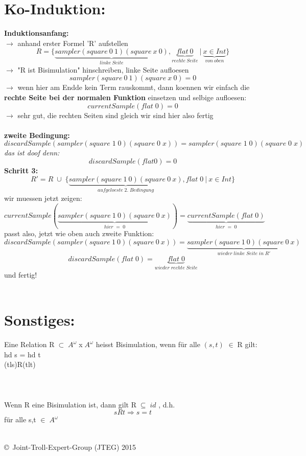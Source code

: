 \documentclass{article}
\begin{document}
	\section{Ko-Induktion:}
	\textbf{Induktionsanfang:}\\
	$\rightarrow$ anhand erster Formel 'R' aufstellen
	\[ 
		R = \{ 
			\underbrace{
				sampler(square\:0\:1)(square\:x\:0)}_{linke\:Seite},\underbrace{flat\:0}_{rechte\:Seite} \:|\: \underbrace{x\in Int}_{von\:oben}\}
		\]
	$\rightarrow$ "R ist Bisimulation" hinschreiben, linke Seite aufloesen\\
	\[ sampler(square\:0\:1)(square\:x\:0) = 0 \]
	$\rightarrow$ wenn hier am Endde kein Term rauskommt, dann koennen wir einfach die \textbf{rechte Seite bei der normalen Funktion} einsetzen und selbige aufloesen:
	\[ currentSample(flat\;0) = 0 \]
	$\rightarrow$ sehr gut, die rechten Seiten sind gleich wir sind hier also fertig\\ \\
	\textbf{zweite Bedingung:}
		\[discardSample(sampler(square\;1\;0)(square\;0\;x)) = sampler(square\;1\;0)(square\;0\;x)\]
	\textit{das ist doof denn:}
		\[discardSample(flat 0) = 0\]
	\textbf{Schritt 3:}\\
	\[R' = R \;\cup\;\{\underbrace{sampler(square\:1\:0)(square\:0\:x)}_{aufgeloeste\;2.\;Bedingung},flat\;0\:|\:x\in Int\}\]	
	wir muessen jetzt zeigen:
	\[
		currentSample(\underbrace{sampler(square\:1\:0)(square\:0\:x)}_{hier\;=\;0}) = \underbrace{currentSample(flat\;0)}_{hier\;=\;0}
	\]
	passt also, jetzt wie oben auch zweite Funktion:
	\[
		discardSample(sampler(square\:1\:0)(square\:0\:x)) = \underbrace{sampler(square\:1\:0)(square\:0\:x)}_{wieder\;linke\;Seite\;in\;R'}\]\[
		discardSample(flat\;0) = \underbrace{flat\;0}_{wieder\;rechte\;Seite}
	\]
	und fertig!\\\\
\section*{Sonstiges:}
	Eine Relation $\mathrm{R}\;\subset\;A^{\omega}\;$x$\;A^{\omega}$ heisst Bisimulation, wenn f\"ur
	alle $(s,t)$ $\in\; \mathrm{R}$ gilt: \\
	\noindent\hspace{1cm} hd s = hd t\\
	\noindent\hspace{1cm} (tl\;s)\;R\;(tl\;t)\\\\\\\\

	Wenn R eine Bisimulation ist, dann gilt $\mathrm{R}\;\subseteq\;id$ , d.h.
	\[
		sRt \Rightarrow s = t
	\]
	f\"ur alle s,t $\in\;A^\omega$\\\\
	\begin{tiny}
	\copyright\ Joint-Troll-Expert-Group (JTEG) 2015
	\end{tiny}
	\newpage
	
	
	
	
	
	
	
	
	
	
	
	
	
	
	
	
\end{document}
